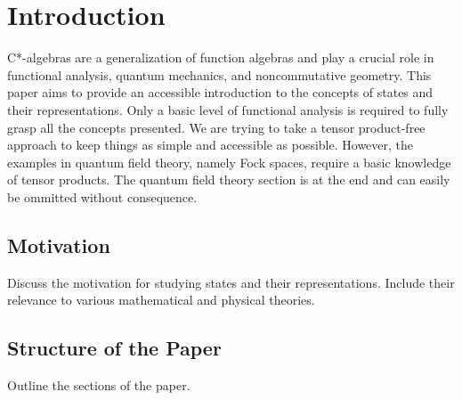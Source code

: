 \section{Introduction}
\label{sec:intro}
C*-algebras are a generalization of function algebras and play a crucial role in
functional analysis, quantum mechanics, and noncommutative geometry. This paper aims
to provide an accessible introduction to the concepts of states and their representations.
Only a basic level of functional analysis is required to fully grasp all the concepts
presented. We are trying to take a tensor product-free approach to keep things as
simple and accessible as possible. However, the examples in quantum field theory,
namely Fock spaces, require a basic knowledge of tensor products. The quantum field
theory section is at the end and can easily be ommitted without consequence.



\subsection{Motivation}
Discuss the motivation for studying states and their representations. Include their relevance to various mathematical and physical theories.

\subsection{Structure of the Paper}
Outline the sections of the paper.